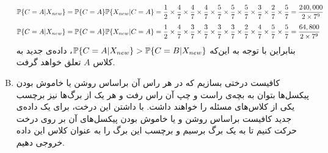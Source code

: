 \documentclass[a4paper, 12pt]{article}
\begin{document}
\begin{enumerate}[A)]
	\[
	\begin{aligned}
		&{\mathbb P}\{C=A|X_{new}\} = {\mathbb P}\{C=A\}{\mathbb P}\{X_{new}|C=A\} = \frac{1}{2} \times \frac{4}{7} \times \frac{4}{7} \times \frac{4}{7} \times \frac{5}{7} \times \frac{5}{7} \times \frac{5}{7} \times \frac{3}{7} \times \frac{2}{7} \times \frac{5}{7} = \frac{240,000}{2\times 7^9}\\[0.4em]
		&{\mathbb P}\{C=A|X_{new}\} = {\mathbb P}\{C=A\}{\mathbb P}\{X_{new}|C=A\} = \frac{1}{2} \times \frac{4}{7} \times \frac{3}{7} \times \frac{3}{7} \times \frac{3}{7} \times \frac{3}{7} \times \frac{2}{7} \times \frac{4}{7} \times \frac{5}{7} \times \frac{5}{7} = \frac{64,800}{2\times 7^9}
	\end{aligned}
	\]
	بنابراین با توجه به این‌که
	${\mathbb P}\{C=A|X_{new}\} > {\mathbb P}\{C=B|X_{new}\}$،
	داده‌ی جدید به کلاس $A$ تعلق خواهد گرفت.
	\item
	کافیست درختی بسازیم که در هر راس آن براساس روشن یا خاموش بودن پیکسل‌ها بتوان به بچه‌ی راست و چپ آن راس رفت و هر یک از برگ‌ها نیز برچسب یکی از کلاس‌های مسئله را خواهند داشت. با داشتن این درخت، برای یک داده‌ی جدید کافیست براساس روشن و یا خاموش بودن پیکسل‌های آن بر روی درخت حرکت کنیم تا به یک برگ برسیم و برچسب این برگ را به عنوان کلاس این داده خروجی دهیم.
\end{enumerate}

\pagebreak
\end{document}
